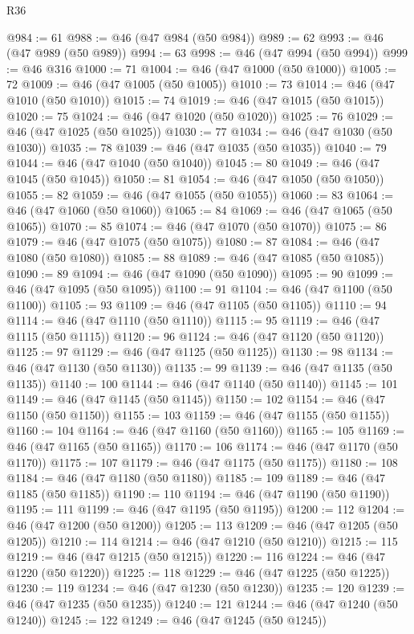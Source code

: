 \begin{lexlean}{R36}
\begin{coremodule}
@984 := 61
@988 := @46 (@47 @984 (@50 @984))
@989 := 62
@993 := @46 (@47 @989 (@50 @989))
@994 := 63
@998 := @46 (@47 @994 (@50 @994))
@999 := @46 @316
@1000 := 71
@1004 := @46 (@47 @1000 (@50 @1000))
@1005 := 72
@1009 := @46 (@47 @1005 (@50 @1005))
@1010 := 73
@1014 := @46 (@47 @1010 (@50 @1010))
@1015 := 74
@1019 := @46 (@47 @1015 (@50 @1015))
@1020 := 75
@1024 := @46 (@47 @1020 (@50 @1020))
@1025 := 76
@1029 := @46 (@47 @1025 (@50 @1025))
@1030 := 77
@1034 := @46 (@47 @1030 (@50 @1030))
@1035 := 78
@1039 := @46 (@47 @1035 (@50 @1035))
@1040 := 79
@1044 := @46 (@47 @1040 (@50 @1040))
@1045 := 80
@1049 := @46 (@47 @1045 (@50 @1045))
@1050 := 81
@1054 := @46 (@47 @1050 (@50 @1050))
@1055 := 82
@1059 := @46 (@47 @1055 (@50 @1055))
@1060 := 83
@1064 := @46 (@47 @1060 (@50 @1060))
@1065 := 84
@1069 := @46 (@47 @1065 (@50 @1065))
@1070 := 85
@1074 := @46 (@47 @1070 (@50 @1070))
@1075 := 86
@1079 := @46 (@47 @1075 (@50 @1075))
@1080 := 87
@1084 := @46 (@47 @1080 (@50 @1080))
@1085 := 88
@1089 := @46 (@47 @1085 (@50 @1085))
@1090 := 89
@1094 := @46 (@47 @1090 (@50 @1090))
@1095 := 90
@1099 := @46 (@47 @1095 (@50 @1095))
@1100 := 91
@1104 := @46 (@47 @1100 (@50 @1100))
@1105 := 93
@1109 := @46 (@47 @1105 (@50 @1105))
@1110 := 94
@1114 := @46 (@47 @1110 (@50 @1110))
@1115 := 95
@1119 := @46 (@47 @1115 (@50 @1115))
@1120 := 96
@1124 := @46 (@47 @1120 (@50 @1120))
@1125 := 97
@1129 := @46 (@47 @1125 (@50 @1125))
@1130 := 98
@1134 := @46 (@47 @1130 (@50 @1130))
@1135 := 99
@1139 := @46 (@47 @1135 (@50 @1135))
@1140 := 100
@1144 := @46 (@47 @1140 (@50 @1140))
@1145 := 101
@1149 := @46 (@47 @1145 (@50 @1145))
@1150 := 102
@1154 := @46 (@47 @1150 (@50 @1150))
@1155 := 103
@1159 := @46 (@47 @1155 (@50 @1155))
@1160 := 104
@1164 := @46 (@47 @1160 (@50 @1160))
@1165 := 105
@1169 := @46 (@47 @1165 (@50 @1165))
@1170 := 106
@1174 := @46 (@47 @1170 (@50 @1170))
@1175 := 107
@1179 := @46 (@47 @1175 (@50 @1175))
@1180 := 108
@1184 := @46 (@47 @1180 (@50 @1180))
@1185 := 109
@1189 := @46 (@47 @1185 (@50 @1185))
@1190 := 110
@1194 := @46 (@47 @1190 (@50 @1190))
@1195 := 111
@1199 := @46 (@47 @1195 (@50 @1195))
@1200 := 112
@1204 := @46 (@47 @1200 (@50 @1200))
@1205 := 113
@1209 := @46 (@47 @1205 (@50 @1205))
@1210 := 114
@1214 := @46 (@47 @1210 (@50 @1210))
@1215 := 115
@1219 := @46 (@47 @1215 (@50 @1215))
@1220 := 116
@1224 := @46 (@47 @1220 (@50 @1220))
@1225 := 118
@1229 := @46 (@47 @1225 (@50 @1225))
@1230 := 119
@1234 := @46 (@47 @1230 (@50 @1230))
@1235 := 120
@1239 := @46 (@47 @1235 (@50 @1235))
@1240 := 121
@1244 := @46 (@47 @1240 (@50 @1240))
@1245 := 122
@1249 := @46 (@47 @1245 (@50 @1245))

\end{coremodule}
\end{lexlean}
